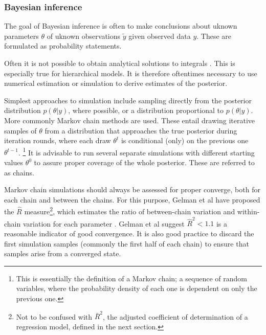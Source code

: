 \subsubsection{Bayesian inference}\label{simulation}

The goal of Bayesian inference is often to make conclusions about uknown
parameters $\theta$ of uknown observations $\tilde{y}$ given observed data
$y$. These are formulated as probability statements.

Often it is not possible to obtain analytical solutions to integrals
. This is especially true for hierarchical models. It is therefore
oftentimes necessary to use numerical estimation or simulation to
derive estimates of the posterior.



Simplest approaches to simulation include sampling directly from the posterior
distribution $p(\theta|y)$, where possible, or a distribution proportional
to $p(\theta|y)$. More commonly Markov chain methods are used. These entail
drawing iterative samples of $\theta$ from a distribution that approaches
the true posterior during iteration rounds, where each draw $\theta^t$ is
conditional (only) on the previous one $\theta^{t-1}$.
\footnote{This is essentially the definition of a Markov chain; a sequence of random
variables, where the probability density of each one is dependent on only the
previous one.} It is advisable to run several separate simulations with
different starting values $\theta^0$ to assure proper coverage of the whole
posterior. These are referred to as chains.

Markov chain simulations should always be assessed for proper converge, both
for each chain and between the chains. For this purpose, Gelman et al have
proposed the $\hat{R}$ measure\footnote{Not to be confused with $\bar{R}^2$,
the adjusted coefficient of determination of a regression model, defined in
the next section.}, which estimates the ratio of between-chain variation and
within-chain variation for each parameter \citep{Gelman2013}. Gelman et al
suggest $\hat{R}^2 < 1.1$ is a reasonable indicator of good convergence. It is
also good practice to discard the first simulation samples (commonly the first
half of each chain) to ensure that samples arise from a converged state.



